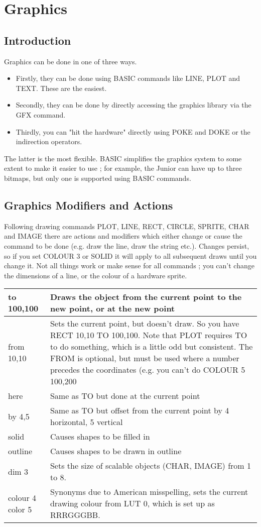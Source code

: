 \chapter{Graphics}

\section{Introduction}

Graphics can be done in one of three ways. 

\begin{itemize}
\item Firstly, they can be done using BASIC commands like LINE, PLOT and TEXT. These are the easiest.
\item Secondly, they can be done by directly accessing the graphics library via the GFX command. 
\item Thirdly, you can "hit the hardware" directly using POKE and DOKE or the indirection operators.
\end{itemize}
The latter is the most flexible. BASIC simplifies the graphics system to some extent to make it easier to use ; for example, the Junior can have up to three bitmaps, but only one is supported using BASIC commands.

\section{Graphics Modifiers and Actions}
Following drawing commands PLOT, LINE, RECT, CIRCLE, SPRITE, CHAR and IMAGE there are actions and modifiers which either change or cause the command to be done (e.g. draw the line, draw the string etc.). 
Changes persist, so if you set COLOUR 3 or SOLID it will apply to all subsequent draws until you change it.
Not all things work or make sense for all commands ; you can’t change the dimensions of a line, or the colour of a hardware sprite.

\begin{tabular} {|p{1.0in}|p{4.5in}|}
\hline
to 100,100 & Draws the object from the current point to the new point, or at the new point \\
\hline
from 10,10 & Sets the current point, but doesn’t draw. So you have RECT 10,10 TO 100,100. Note that PLOT requires TO to do something, which is a little odd but consistent. The FROM is optional, but must be used where a number precedes the coordinates (e.g. you can’t do COLOUR 5 100,200 \\
\hline
here & Same as TO but done at the current point \\
\hline
by 4,5 & Same as TO but offset from the current point by 4 horizontal, 5 vertical \\
\hline
solid & Causes shapes to be filled in\\
\hline
outline & Causes shapes to be drawn in outline\\
\hline
dim 3 & Sets the size of scalable objects (CHAR, IMAGE) from 1 to 8.\\
\hline
colour 4 color 5 & Synonyms due to American misspelling, sets the current drawing colour from LUT 0, which is set up as  RRRGGGBB. \\
\hline
\end{tabular}

